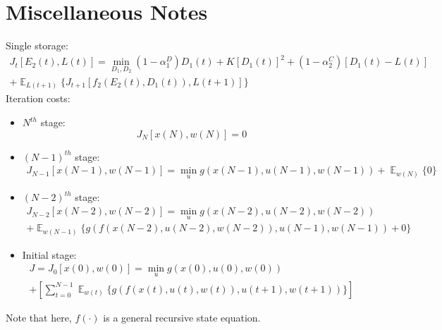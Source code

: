 \documentclass{article}
\DeclareMathOperator{\E}{\mathbb{E}}
\begin{document}
	\section{Miscellaneous Notes}
	Single storage:
	\begin{multline}
	J_{t}[E_{2}(t),L(t)] = \min_{D_{1},D_{2}}
	(1-\alpha_{1}^{D})D_{1}(t) 
	+ K[D_{1}(t)]^{2}
	+(1-\alpha_{2}^{C})[D_{1}(t)-L(t)]\\
	+\mathop{\E}_{L(t+1)} \{J_{t+1}[f_{2}(E_{2}(t),D_{1}(t)),L(t+1)]\}
	\end{multline}
	Iteration costs:
	\begin{itemize}
	\item $N^{th}$ stage: \\
	\begin{equation}
	J_{N}[x(N),w(N)]=0
	\end{equation}
	
	\item $(N-1)^{th}$ stage: \\
	\begin{multline}
	J_{N-1}[x(N-1),w(N-1)]=\min_{u} g(x(N-1),u(N-1),w(N-1))+ \mathop{\E}_{w(N)}\{0\}
	\end{multline}
	
	\item $(N-2)^{th}$ stage: \\
	\begin{multline}
	J_{N-2}[x(N-2),w(N-2)]=\min_{u} g(x(N-2),u(N-2),w(N-2))\\
	+ \mathop{\E}_{w(N-1)} \{
	g( f(x(N-2),u(N-2),w(N-2)) ,u(N-1),w(N-1))+0\}
	\end{multline}
	
	\item Initial stage: \\	
	\begin{multline}
	J=J_{0}[x(0),w(0)]=\min_{u} g(x(0),u(0),w(0))\\
	+\left[\sum_{t=0}^{N-1}\mathop{\E}_{w(t)} \{
	g( f(x(t),u(t),w(t)) ,u(t+1),w(t+1))
	\}\right]
	\end{multline}
	\end{itemize}

	Note that here, $f(\cdot)$ is a general recursive state equation.
	
	
	
\end{document}

